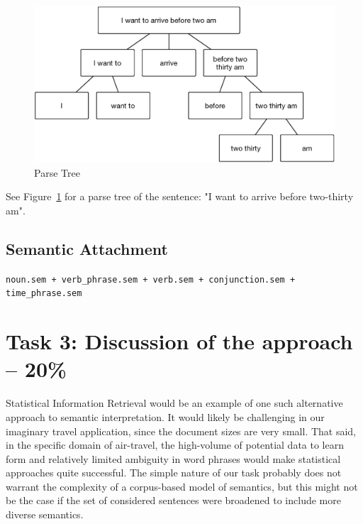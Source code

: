\documentclass{article}
\begin{document}
\begin{figure}
  \centering
  \includegraphics[width=\textwidth]{semantic_interpretation.eps}
  \caption{Parse Tree}
  \label{fig:semantic_interpretation}
\end{figure}

See Figure~\ref{fig:semantic_interpretation} for a parse tree of the sentence:
"I want to arrive before two-thirty am".

\subsection{Semantic Attachment}

{\small \verb!noun.sem + verb_phrase.sem + verb.sem + conjunction.sem + time_phrase.sem!}

\section{Task 3: Discussion of the approach – 20\%}

Statistical Information Retrieval would be an example of one such alternative
approach to semantic interpretation. It would likely be challenging in our
imaginary travel application, since the document sizes are very small. That
said, in the specific domain of air-travel, the high-volume of potential data to
learn form and relatively limited ambiguity in word phrases would make
statistical approaches quite successful. The simple nature of our task probably
does not warrant the complexity of a corpus-based model of semantics, but this
might not be the case if the set of considered sentences were broadened to
include more diverse semantics.
\end{document}
